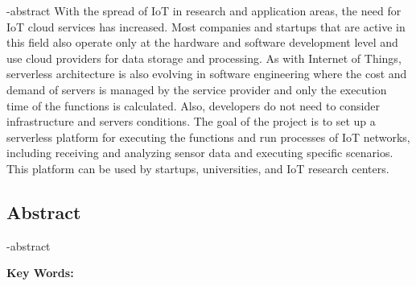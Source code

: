 
\en-abstract{
With the spread of IoT in research and application areas, the need for IoT cloud services has increased. Most companies and startups that are active in this field also operate only at the hardware and software development level and use cloud providers for data storage and processing. As with Internet of Things, serverless architecture is also evolving in software engineering where the cost and demand of servers is managed by the service provider and only the execution time of the functions is calculated. Also, developers do not need to consider infrastructure and servers conditions. The goal of the project is to set up a serverless platform for executing the functions and run processes of IoT networks, including receiving and analyzing sensor data and executing specific scenarios. This platform can be used by startups, universities, and IoT research centers.
}

\newpage
\thispagestyle{empty}
\begin{latin}
\section*{\LARGE\centering Abstract}

\een-abstract

\vspace*{.5cm}
{\large\textbf{Key Words:}}\par
\vspace*{.5cm}
\elatinkeywords
\end{latin}